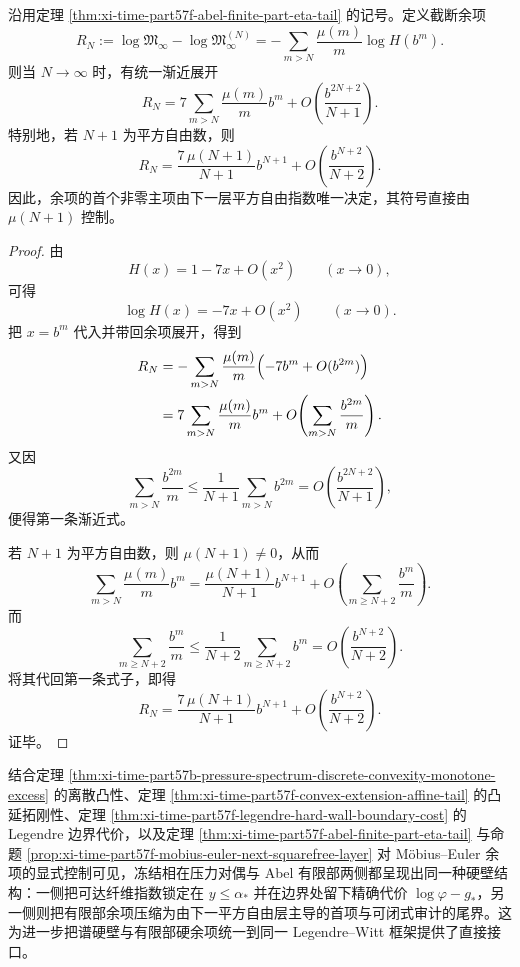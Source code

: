 \begin{proposition}\label{prop:xi-time-part57f-mobius-euler-next-squarefree-layer}
沿用定理 \ref{thm:xi-time-part57f-abel-finite-part-eta-tail} 的记号。定义截断余项
\[
R_N:=
\log\mathfrak M_\infty-\log\mathfrak M_\infty^{(N)}
=
-\sum_{m>N}\frac{\mu(m)}{m}\log H(b^m).
\]
则当 \(N\to\infty\) 时，有统一渐近展开
\[
\boxed{\;
R_N
=
7\sum_{m>N}\frac{\mu(m)}{m}b^m
+
O\!\left(\frac{b^{2N+2}}{N+1}\right).\;}
\]
特别地，若 \(N+1\) 为平方自由数，则
\[
\boxed{\;
R_N
=
\frac{7\,\mu(N+1)}{N+1}b^{N+1}
+
O\!\left(\frac{b^{N+2}}{N+2}\right).\;}
\]
因此，余项的首个非零主项由下一层平方自由指数唯一决定，其符号直接由 \(\mu(N+1)\) 控制。
\end{proposition}
\begin{proof}
由
\[
H(x)=1-7x+O(x^2)
\qquad
(x\to 0),
\]
可得
\[
\log H(x)=-7x+O(x^2)
\qquad
(x\to 0).
\]
把 \(x=b^m\) 代入并带回余项展开，得到
\[
\begin{aligned}
R_N
&=
-\sum_{m>N}\frac{\mu(m)}{m}\Bigl(-7b^m+O(b^{2m})\Bigr)\\
&=
7\sum_{m>N}\frac{\mu(m)}{m}b^m
+
O\!\left(\sum_{m>N}\frac{b^{2m}}{m}\right).
\end{aligned}
\]
又因
\[
\sum_{m>N}\frac{b^{2m}}{m}
\le
\frac{1}{N+1}\sum_{m>N}b^{2m}
=
O\!\left(\frac{b^{2N+2}}{N+1}\right),
\]
便得第一条渐近式。

若 \(N+1\) 为平方自由数，则 \(\mu(N+1)\neq 0\)，从而
\[
\sum_{m>N}\frac{\mu(m)}{m}b^m
=
\frac{\mu(N+1)}{N+1}b^{N+1}
+
O\!\left(\sum_{m\ge N+2}\frac{b^m}{m}\right).
\]
而
\[
\sum_{m\ge N+2}\frac{b^m}{m}
\le
\frac{1}{N+2}\sum_{m\ge N+2}b^m
=
O\!\left(\frac{b^{N+2}}{N+2}\right).
\]
将其代回第一条式子，即得
\[
R_N
=
\frac{7\,\mu(N+1)}{N+1}b^{N+1}
+
O\!\left(\frac{b^{N+2}}{N+2}\right).
\]
证毕。
\end{proof}

\noindent 结合定理 \ref{thm:xi-time-part57b-pressure-spectrum-discrete-convexity-monotone-excess} 的离散凸性、定理 \ref{thm:xi-time-part57f-convex-extension-affine-tail} 的凸延拓刚性、定理 \ref{thm:xi-time-part57f-legendre-hard-wall-boundary-cost} 的 Legendre 边界代价，以及定理 \ref{thm:xi-time-part57f-abel-finite-part-eta-tail} 与命题 \ref{prop:xi-time-part57f-mobius-euler-next-squarefree-layer} 对 Möbius--Euler 余项的显式控制可见，冻结相在压力对偶与 Abel 有限部两侧都呈现出同一种硬壁结构：一侧把可达纤维指数锁定在 \(y\le \alpha_*\) 并在边界处留下精确代价 \(\log\varphi-g_*\)，另一侧则把有限部余项压缩为由下一平方自由层主导的首项与可闭式审计的尾界。这为进一步把谱硬壁与有限部硬余项统一到同一 Legendre--Witt 框架提供了直接接口。

\endinput
